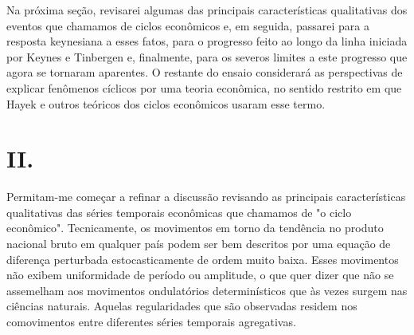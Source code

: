 \documentclass[12pt]{article}
\begin{document}
Na próxima seção, revisarei algumas das principais características qualitativas dos eventos que chamamos de ciclos econômicos e, em seguida, passarei para a resposta keynesiana a esses fatos, para o progresso feito ao longo da linha iniciada por Keynes e Tinbergen e, finalmente, para os severos limites a este progresso que agora se tornaram aparentes. O restante do ensaio considerará as perspectivas de explicar fenômenos cíclicos por uma teoria econômica, no sentido restrito em que Hayek e outros teóricos dos ciclos econômicos usaram esse termo.

\section*{II.}

Permitam-me começar a refinar a discussão revisando as principais características qualitativas das séries temporais econômicas que chamamos de "o ciclo econômico". Tecnicamente, os movimentos em torno da tendência no produto nacional bruto em qualquer país podem ser bem descritos por uma equação de diferença perturbada estocasticamente de ordem muito baixa. Esses movimentos não exibem uniformidade de período ou amplitude, o que quer dizer que não se assemelham aos movimentos ondulatórios determinísticos que às vezes surgem nas ciências naturais. Aquelas regularidades que são observadas residem nos comovimentos entre diferentes séries temporais agregativas.
\end{document}
